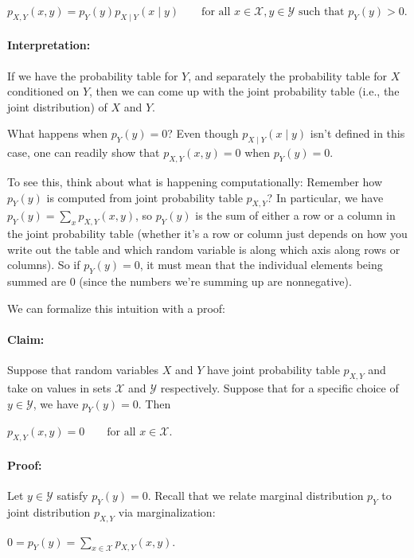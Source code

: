\documentclass[6008notes.tex]{subfiles}
\begin{document}
{\centering$p_{X,Y}(x,y)=p_{Y}(y)p_{X\mid Y}(x\mid y)\qquad \text {for all }x\in \mathcal{X},y\in \mathcal{Y}\text { such that }p_{Y}(y)>0.$ \par}
 
\paragraph{Interpretation:} If we have the probability table for $Y$, and separately the probability table for $X$ conditioned on $Y$, then we can come up with the joint probability table (i.e., the joint distribution) of $X$ and $Y$.

What happens when $p_{Y}(y)=0$? Even though $p_{X\mid Y}(x\mid y)$ isn't defined in this case, one can readily show that $p_{X,Y}(x,y)=0$ when $p_{Y}(y)=0$.

To see this, think about what is happening computationally: Remember how $p_Y(y)$ is computed from joint probability table $p_{X,Y}$? In particular, we have $p_{Y}(y)=\sum _{x}p_{X,Y}(x,y)$, so $p_Y(y)$ is the sum of either a row or a column in the joint probability table (whether it's a row or column just depends on how you write out the table and which random variable is along which axis along rows or columns). So if $p_{Y}(y)=0$, it must mean that the individual elements being summed are 0 (since the numbers we're summing up are nonnegative).

We can formalize this intuition with a proof:

\paragraph{Claim:} Suppose that random variables $X$ and $Y$ have joint probability table $p_{X,Y}$ and take on values in sets $\mathcal{X}$ and $\mathcal{Y}$ respectively. Suppose that for a specific choice of $y\in \mathcal{Y}$, we have $p_{Y}(y)=0$. Then

{\centering$p_{X,Y}(x,y)=0\qquad \text {for all }x\in \mathcal{X}.$ \par}
 
\paragraph{Proof:} Let $y\in \mathcal{Y}$ satisfy $p_{Y}(y)=0$. Recall that we relate marginal distribution $p_Y$ to joint distribution $p_{X,Y}$ via marginalization:

{\centering$0=p_{Y}(y)=\sum _{x\in \mathcal{X}}p_{X,Y}(x,y).$ \par}
 
\end{document}
